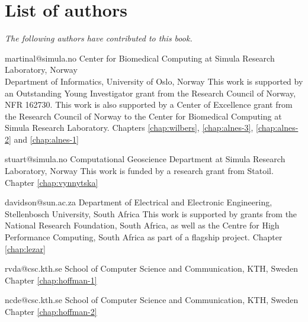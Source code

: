 
\chapter*{List of authors}
\addtocounter{chapter}{1}
\vspace{-1cm}

\emph{The following authors have contributed to this book.}

\vspace{1cm}

             {martinal@simula.no}
             {Center for Biomedical Computing at Simula Research Laboratory, Norway \\
              Department of Informatics, University of Oslo, Norway}
             {This work is supported by an Outstanding Young
              Investigator grant from the Research Council of Norway,
              NFR 162730.
              This work is also supported by a Center of Excellence grant
              from the Research Council of Norway to the Center for
              Biomedical Computing at Simula Research Laboratory.}
             {Chapters
              \ref{chap:wilbers},
              \ref{chap:alnes-3},
              \ref{chap:alnes-2} and
              \ref{chap:alnes-1}}

             {stuart@simula.no}
             {Computational Geoscience Department at Simula Research Laboratory, Norway}
             {This work is funded by a research grant from Statoil.}
             {Chapter \ref{chap:vynnytska}}

             {davidson@sun.ac.za}
             {Department of Electrical and Electronic Engineering, Stellenbosch University, South Africa}
             {This work is supported by grants from the National Research
              Foundation, South Africa, as well as the Centre for High Performance
              Computing, South Africa as part of a flagship project.}
             {Chapter \ref{chap:lezar}}

             {rvda@csc.kth.se}
             {School of Computer Science and Communication, KTH, Sweden}
             {}
             {Chapter \ref{chap:hoffman-1}}

             {ncde@csc.kth.se}
             {School of Computer Science and Communication, KTH, Sweden}
             {}
             {Chapter \ref{chap:hoffman-2}}

